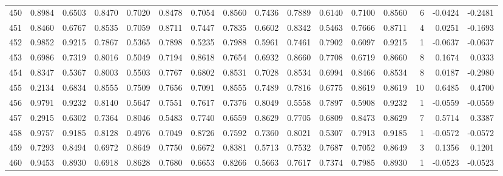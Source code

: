 \begin{tabular}{lrrrrrrrrrrrrrrr}
450 &      0.8984 &  0.6503 &  0.8470 &  0.7020 &  0.8478 &  0.7054 &  0.8560 &  0.7436 &  0.7889 &  0.6140 &   0.7100 &     0.8560 &      6 &                   -0.0424 &                    -0.2481 \\
451 &      0.8460 &  0.6767 &  0.8535 &  0.7059 &  0.8711 &  0.7447 &  0.7835 &  0.6602 &  0.8342 &  0.5463 &   0.7666 &     0.8711 &      4 &                    0.0251 &                    -0.1693 \\
452 &      0.9852 &  0.9215 &  0.7867 &  0.5365 &  0.7898 &  0.5235 &  0.7988 &  0.5961 &  0.7461 &  0.7902 &   0.6097 &     0.9215 &      1 &                   -0.0637 &                    -0.0637 \\
453 &      0.6986 &  0.7319 &  0.8016 &  0.5049 &  0.7194 &  0.8618 &  0.7654 &  0.6932 &  0.8660 &  0.7708 &   0.6719 &     0.8660 &      8 &                    0.1674 &                     0.0333 \\
454 &      0.8347 &  0.5367 &  0.8003 &  0.5503 &  0.7767 &  0.6802 &  0.8531 &  0.7028 &  0.8534 &  0.6994 &   0.8466 &     0.8534 &      8 &                    0.0187 &                    -0.2980 \\
455 &      0.2134 &  0.6834 &  0.8555 &  0.7509 &  0.7656 &  0.7091 &  0.8555 &  0.7489 &  0.7816 &  0.6775 &   0.8619 &     0.8619 &     10 &                    0.6485 &                     0.4700 \\
456 &      0.9791 &  0.9232 &  0.8140 &  0.5647 &  0.7551 &  0.7617 &  0.7376 &  0.8049 &  0.5558 &  0.7897 &   0.5908 &     0.9232 &      1 &                   -0.0559 &                    -0.0559 \\
457 &      0.2915 &  0.6302 &  0.7364 &  0.8046 &  0.5483 &  0.7740 &  0.6559 &  0.8629 &  0.7705 &  0.6809 &   0.8473 &     0.8629 &      7 &                    0.5714 &                     0.3387 \\
458 &      0.9757 &  0.9185 &  0.8128 &  0.4976 &  0.7049 &  0.8726 &  0.7592 &  0.7360 &  0.8021 &  0.5307 &   0.7913 &     0.9185 &      1 &                   -0.0572 &                    -0.0572 \\
459 &      0.7293 &  0.8494 &  0.6972 &  0.8649 &  0.7750 &  0.6672 &  0.8381 &  0.5713 &  0.7532 &  0.7687 &   0.7052 &     0.8649 &      3 &                    0.1356 &                     0.1201 \\
460 &      0.9453 &  0.8930 &  0.6918 &  0.8628 &  0.7680 &  0.6653 &  0.8266 &  0.5663 &  0.7617 &  0.7374 &   0.7985 &     0.8930 &      1 &                   -0.0523 &                    -0.0523 \\

\end{tabular}
